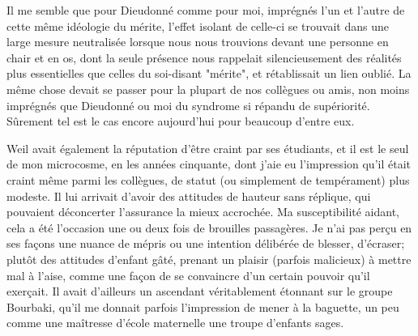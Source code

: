 Il me semble que pour Dieudonné comme pour moi, imprégnés l'un et l'autre de cette même idéologie du mérite, l'effet isolant de celle-ci se trouvait dans une large mesure neutralisée lorsque nous nous trouvions devant une personne en chair et en os, dont la seule présence nous rappelait silencieusement des réalités plus essentielles que celles du soi-disant "mérite", et rétablissait un lien oublié. La même chose devait se passer pour la plupart de nos collègues ou amis, non moins imprégnés que Dieudonné ou moi du syndrome si répandu de supériorité. Sûrement tel est le cas encore aujourd'hui pour beaucoup d'entre eux.

Weil avait également la réputation d'être craint par ses étudiants, et il est le seul de mon microcosme, en les années cinquante, dont j'aie eu l'impression qu'il était craint même parmi les collègues, de statut (ou simplement de tempérament) plus modeste. Il lui arrivait d'avoir des attitudes de hauteur sans réplique, qui pouvaient déconcerter l'assurance la mieux accrochée. Ma susceptibilité aidant, cela a été l'occasion une ou deux fois de brouilles passagères. Je n'ai pas perçu en ses façons une nuance de mépris ou une intention délibérée de blesser, d'écraser; plutôt des attitudes d'enfant gâté, prenant un plaisir (parfois malicieux) à mettre mal à l'aise, comme une façon de se convaincre d'un certain pouvoir qu'il exerçait. Il avait d'ailleurs un ascendant véritablement étonnant sur le groupe Bourbaki, qu'il me donnait parfois l'impression de mener à la baguette, un peu comme une maîtresse d'école maternelle une troupe d'enfants sages.

